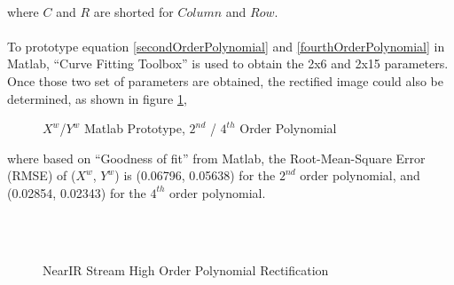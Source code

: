 \\\par%
%
where \(C\) and \(R\) are shorted for \(Column\) and \(Row\).
\\\\%
To prototype equation \ref{secondOrderPolynomial} and \ref{fourthOrderPolynomial} in Matlab, \enquote{Curve Fitting Toolbox} is used to obtain the 2x6 and 2x15 parameters. Once those two set of parameters are obtained, the rectified image could also be determined, as shown in figure \ref{MatlabPrototpyeOfHighOrder},\par%
%
\begin{figure}[h]
\hspace*{-0.3cm}
\centering
{}
{}
%
\caption{\(X^w\)/\(Y^w\) Matlab Prototype, \(2^{nd}\) / \(4^{th}\) Order Polynomial}
\label{MatlabPrototpyeOfHighOrder}
\end{figure}%
%
where based on \enquote{Goodness of fit} from Matlab, the Root-Mean-Square Error (RMSE) of (\(X^w\), \(Y^w\)) is (0.06796, 0.05638) for the \(2^{nd}\) order polynomial, and (0.02854, 0.02343) for the \(4^{th}\) order polynomial.
\\\\%
%
 \begin{figure}[h]
\centering
\hspace*{-0.3cm}
%
%
\\%
\hspace*{-0.3cm}
%
%
\caption{NearIR Stream High Order Polynomial Rectification}
\label{HighOrderNearIRRectification}
\end{figure}%
